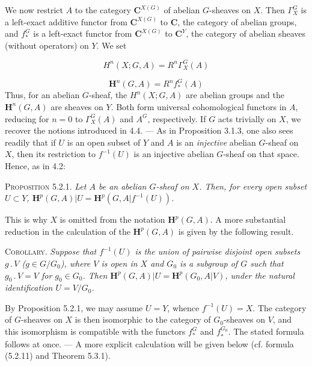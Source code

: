 \clearpage
{}

We now restrict $A$ to the category ${\mathbf C}^{X(G)}$ of abelian $G$-sheaves on
$X$. Then $\Gamma_X^G$ is a left-exact additive functor from ${\mathbf C}^{X(G)}$ to
${\mathbf C}$, the category of abelian groups, and $f_*^G$ is a left-exact functor from
${\mathbf C}^{X(G)}$ to ${\mathbf C}^Y$, the category of abelian sheaves (without operators) on
$Y$. We set

\[
H^n(X;G,A)=R^n\Gamma_X^G(A)
\tag{5.2.3}
\]

\[
\mathbf H^n(G,A)=R^nf_*^G(A)
\tag{5.2.4}
\]
Thus, for an abelian $G$-sheaf, the $H^n(X;G,A)$ are abelian groups and the
$\mathbf H^n(G,A)$ are sheaves on $Y$. Both form universal cohomological
functors in $A$, reducing for $n=0$ to $\Gamma_X^G(A)$ and $A^G$,
respectively. If $G$ acts trivially on $X$, we recover the notions introduced
in 4.4. --- As in Proposition 3.1.3, one also sees readily that if $U$ is an
open subset of $Y$ and $A$ is an \textit{injective} abelian $G$-sheaf on $X$, then its
restriction to $f^{-1}(U)$ is an injective abelian $G$-sheaf on that space.
Hence, as in 4.2:

\textsc{Proposition 5.2.1.} \textit{Let $A$ be an abelian
$G$-sheaf on $X$. Then, for every open subset $U\subset Y$, $\mathbf H^p(G,A)\vert U=\mathbf H^p(G,A\vert f^{-1}(U))$.}

This is why $X$ is omitted from the notation $\mathbf H^p(G,A)$. A more
substantial reduction in the calculation of the $\mathbf H^p(G,A)$ is given
by the following result.

\textsc{Corollary.} \textit{Suppose that $f^{-1}(U)$ is the union
of pairwise disjoint open subsets $g\mathbin{.}V$ ($g\in G/G_0$), where
$V$ is open in $X$ and $G_0$ is a subgroup of $G$ such that
$g_0\mathbin{.}V=V$ for $g_0\in G_0$. Then $\mathbf H^p(G,A)\vert U=\mathbf H^p(G_0,A\vert V)$,
under the natural identification $U=V/G_0$.}

By Proposition 5.2.1, we may assume $U=Y$, whence $f^{-1}(U)=X$. The category
of $G$-sheaves on $X$ is then isomorphic to the category of $G_0$-sheaves on
$V$, and this isomorphism is compatible with the functors $f_*^G$ and
$f_*^{G_0}$. The stated formula follows at once. --- A more explicit
calculation will be given below (cf. formula (5.2.11) and Theorem 5.3.1).

